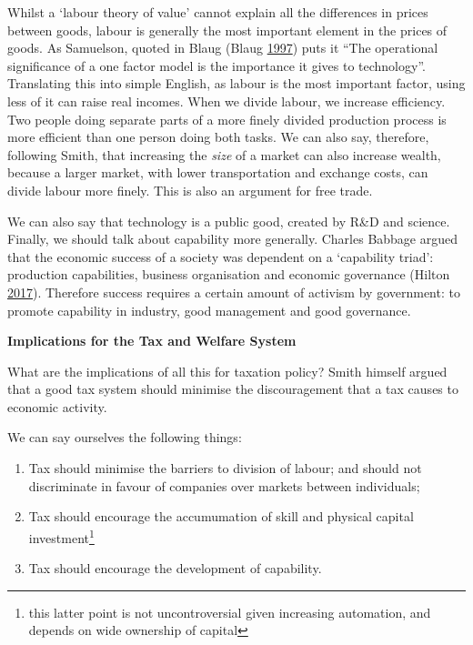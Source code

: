 \documentclass[]{tufte-handout}
\providecommand{\tightlist}{%
  \setlength{\itemsep}{0pt}\setlength{\parskip}{0pt}}
\begin{document}
Whilst a `labour theory of value' cannot explain all the differences in
prices between goods, labour is generally the most important element in
the prices of goods. As Samuelson, quoted in Blaug (Blaug
\protect\hyperlink{ref-blaug1997economic}{1997}) puts it ``The
operational significance of a one factor model is the importance it
gives to technology''. Translating this into simple English, as labour
is the most important factor, using less of it can raise real incomes.
When we divide labour, we increase efficiency. Two people doing separate
parts of a more finely divided production process is more efficient than
one person doing both tasks. We can also say, therefore, following
Smith, that increasing the \emph{size} of a market can also increase
wealth, because a larger market, with lower transportation and exchange
costs, can divide labour more finely. This is also an argument for free
trade.

We can also say that technology is a public good, created by R\&D and
science. Finally, we should talk about capability more generally.
Charles Babbage argued that the economic success of a society was
dependent on a `capability triad': production capabilities, business
organisation and economic governance (Hilton
\protect\hyperlink{ref-Hilton2017}{2017}). Therefore success requires a
certain amount of activism by government: to promote capability in
industry, good management and good governance.

\textbf{Implications for the Tax and Welfare System}

What are the implications of all this for taxation policy? Smith himself
argued that a good tax system should minimise the discouragement that a
tax causes to economic activity.

We can say ourselves the following things:

\begin{enumerate}
\def\labelenumi{\arabic{enumi}.}
\tightlist
\item
  Tax should minimise the barriers to division of labour; and should not
  discriminate in favour of companies over markets between individuals;
\item
  Tax should encourage the accumumation of skill and physical capital
  investment\footnote{this latter point is not uncontroversial given
    increasing automation, and depends on wide ownership of capital}
\item
  Tax should encourage the development of capability.
\end{enumerate}
\end{document}
